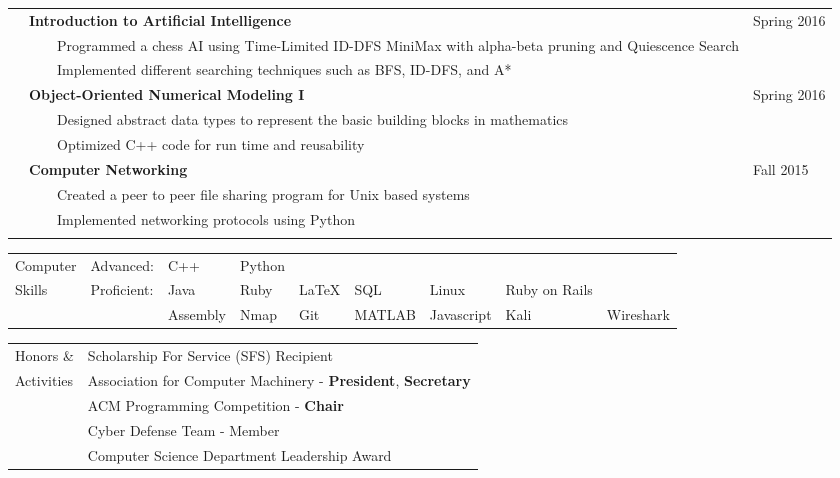 \documentclass[10.5pt, arial]{article}
\newcommand{\tabitem}{~~\llap{\textbullet}~~}
\begin{document}
\begin{tabular}{p{1.5cm} p{13.2cm} l}
			& \textbf{Introduction to Artificial Intelligence} 					& Spring 2016 			\\
			& \tabitem Programmed a chess AI using Time-Limited ID-DFS MiniMax with alpha-beta pruning and Quiescence Search	& \\
			& \tabitem Implemented different searching techniques such as BFS, ID-DFS, and A* 	& 		\\

			& \textbf{Object-Oriented Numerical Modeling I} 					& Spring 2016 			\\
			& \tabitem Designed abstract data types to represent the basic building blocks in mathematics & \\
			& \tabitem Optimized C++ code for run time and reusability 		& 						\\

			& \textbf{Computer Networking} 										& Fall 2015 			\\
			& \tabitem Created a peer to peer file sharing program for Unix based systems 		& 		\\
			& \tabitem Implemented networking protocols using Python 						& 						\\
						\\
\end{tabular}

\begin{tabular}{p{1.5cm} l l l l l l l l}
Computer	& Advanced: 	& C++ 		& Python 	& 			& 			& 			& 					\\
Skills		& Proficient:	& Java 		& Ruby 		& \LaTeX 	& SQL 		& Linux   	& Ruby on Rails	& \\
			&			 	& Assembly 	& Nmap 		& Git 		& MATLAB	& Javascript& Kali		& Wireshark	\\
\end{tabular}

\begin{tabular}{p{1.5cm} l}
Honors \&	& Scholarship For Service (SFS) Recipient 							\\
Activities	& Association for Computer Machinery - \textbf{President}, \textbf{Secretary}			\\
			& ACM Programming Competition - \textbf{Chair}						\\
			& Cyber Defense Team - Member										\\
			& Computer Science Department Leadership Award 						\\
\end{tabular}
\end{document}

